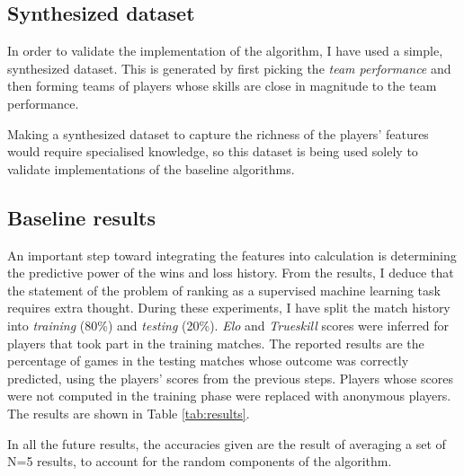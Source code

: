 \documentclass[10pt,a4]{article}
\begin{document}
\subsection{Synthesized dataset}

In order to validate the implementation of the algorithm, I have used a simple,
synthesized dataset. This is generated by first picking the \emph{team performance}
and then forming teams of players whose skills are close in magnitude to the 
team performance. 

Making a synthesized dataset to capture the richness of the 
players' features would require specialised knowledge, so this dataset is being 
used solely to validate implementations of the baseline algorithms.

\subsection{Baseline results}
\label{ssec:baseline}
An important step toward integrating the features into calculation is determining 
the predictive power of the wins and loss history. From the results, I deduce 
that the statement of the problem of ranking as a supervised machine 
learning task requires extra thought. During these experiments, I have split the 
match history into \emph{training} (80\%) and \emph{testing} (20\%). \emph{Elo} and \emph{Trueskill}
scores were inferred for players that took part in the training matches. The reported 
results are the percentage of games in the testing matches whose outcome was 
correctly predicted, using the players' scores from the previous steps. Players 
whose scores were not computed in the training phase were replaced with anonymous 
players. The results are shown in Table \ref{tab:results}.

In all the future results, the accuracies given are the result of averaging a set 
of N=5 results, to account for the random components of the algorithm.
\end{document}
